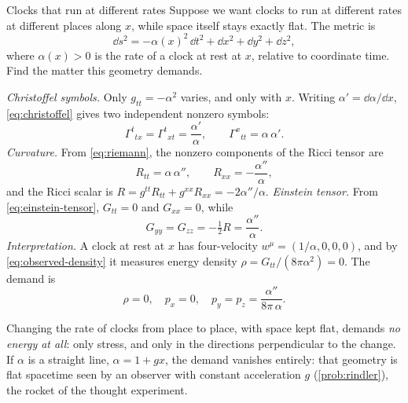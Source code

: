 \begin{example}[label=ex:lapse, unbreakable]{Clocks that run at different rates}
Suppose we want clocks to run at different rates at different places along
$x$, while space itself stays exactly flat. The metric is
\begin{equation}
  \dd s^{2} = -\alpha(x)^{2}\,\dd t^{2} + \dd x^{2} + \dd y^{2} + \dd z^{2},
  \label{eq:lapse-metric}
\end{equation}
where $\alpha(x) > 0$ is the rate of a clock at rest at $x$, relative to
coordinate time. Find the matter this geometry demands.

\solution \emph{Christoffel symbols.} Only $g_{tt} = -\alpha^{2}$ varies, and
only with $x$. Writing $\alpha' = \dd\alpha/\dd x$, \cref{eq:christoffel} gives
two independent nonzero symbols:
\begin{equation*}
  \Gamma^{t}{}_{tx} = \Gamma^{t}{}_{xt} = \frac{\alpha'}{\alpha},
  \qquad
  \Gamma^{x}{}_{tt} = \alpha\,\alpha' .
\end{equation*}
\emph{Curvature.} From \cref{eq:riemann}, the nonzero components of the Ricci
tensor are
\begin{equation*}
  R_{tt} = \alpha\,\alpha'', \qquad R_{xx} = -\frac{\alpha''}{\alpha},
\end{equation*}
and the Ricci scalar is $R = g^{tt}R_{tt} + g^{xx}R_{xx} = -2\alpha''/\alpha$.
\emph{Einstein tensor.} From \cref{eq:einstein-tensor}, $G_{tt} = 0$ and
$G_{xx} = 0$, while
\begin{equation*}
  G_{yy} = G_{zz} = -\tfrac{1}{2}R = \frac{\alpha''}{\alpha}.
\end{equation*}
\emph{Interpretation.} A clock at rest at $x$ has four-velocity
$w^{\mu} = (1/\alpha, 0, 0, 0)$, and by \cref{eq:observed-density} it measures
energy density $\rho = G_{tt}/(8\pi\alpha^{2}) = 0$. The demand is
\begin{equation}
  \rho = 0, \quad p_{x} = 0, \quad p_{y} = p_{z} = \frac{\alpha''}{8\pi\,\alpha}.
  \label{eq:lapse-demand}
\end{equation}

\discussion Changing the rate of clocks from place to place, with space kept
flat, demands \emph{no energy at all}: only stress, and only in the directions
perpendicular to the change. If $\alpha$ is a straight line, $\alpha = 1 + gx$,
the demand vanishes entirely: that geometry is flat spacetime seen by an
observer with constant acceleration $g$ (\cref{prob:rindler}), the rocket of
the thought experiment.
\end{example}

